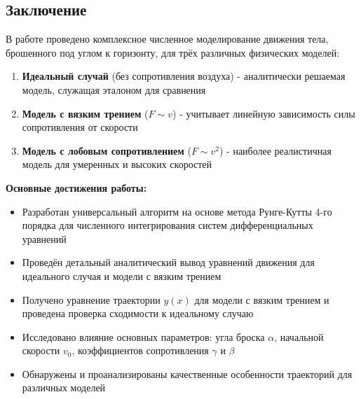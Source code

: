 \begin{center}
    \section{Заключение}
\end{center}

В работе проведено комплексное численное моделирование движения тела, брошенного под углом к горизонту, для трёх различных физических моделей:
\begin{enumerate}
    \item \textbf{Идеальный случай} (без сопротивления воздуха) - аналитически решаемая модель, служащая эталоном для сравнения
    \item \textbf{Модель с вязким трением} ($F \sim v$) - учитывает линейную зависимость силы сопротивления от скорости
    \item \textbf{Модель с лобовым сопротивлением} ($F \sim v^2$) - наиболее реалистичная модель для умеренных и высоких скоростей
\end{enumerate}

\textbf{Основные достижения работы:}

\begin{itemize}
    \item Разработан универсальный алгоритм на основе метода Рунге-Кутты 4-го порядка для численного интегрирования систем дифференциальных уравнений
    \item Проведён детальный аналитический вывод уравнений движения для идеального случая и модели с вязким трением
    \item Получено уравнение траектории $y(x)$ для модели с вязким трением и проведена проверка сходимости к идеальному случаю
    \item Исследовано влияние основных параметров: угла броска $\alpha$, начальной скорости $v_0$, коэффициентов сопротивления $\gamma$ и $\beta$
    \item Обнаружены и проанализированы качественные особенности траекторий для различных моделей
\end{itemize}
